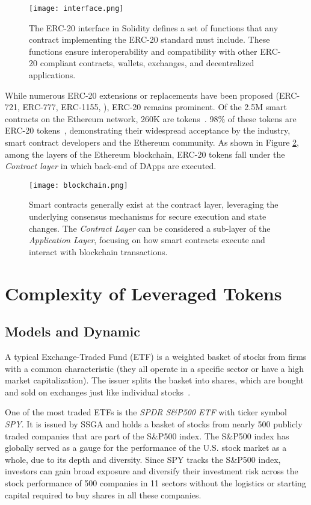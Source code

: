 \begin{figure}[t]
	\centering
	\texttt{[image: interface.png]}
	\caption[The ERC-20 interface in Solidity]{The ERC-20 interface in Solidity defines a set of functions that any contract implementing the ERC-20 standard must include. These functions ensure interoperability and compatibility with other ERC-20 compliant contracts, wallets, exchanges, and decentralized applications.}
	\label{fig:interface}
\end{figure}

While numerous ERC-20 extensions or replacements have been proposed (\eg ERC-721, ERC-777, ERC-1155, \etc), ERC-20 remains prominent. Of the 2.5M smart contracts on the Ethereum network, 260K are tokens~\cite{TokenTracker}. 98\% of these tokens are ERC-20 tokens~\cite{TokenTracker}, demonstrating their widespread acceptance by the industry, smart contract developers and the Ethereum community. As shown in Figure \ref{fig:layers}, among the layers of the Ethereum blockchain, ERC-20 tokens fall under the \textit{Contract layer} in which back-end of DApps are executed.

\begin{figure}[t]
	\centering
	\texttt{[image: blockchain.png]}
	\caption[Ethereum layers and Smart Contract execution]{Smart contracts generally exist at the contract layer, leveraging the underlying consensus mechanisms for secure execution and state changes. The \textit{Contract Layer} can be considered a sub-layer of the \textit{Application Layer}, focusing on how smart contracts execute and interact with blockchain transactions.}
	\label{fig:layers}
\end{figure}

\section{Complexity of Leveraged Tokens}
\subsection{Models and Dynamic}
A typical Exchange-Traded Fund (ETF) is a weighted basket of stocks from firms with a common characteristic (\eg they all operate in a specific sector or have a high market capitalization). The issuer splits the basket into shares, which are bought and sold on exchanges just like individual stocks~\cite{liebi2020effect}.
\begin{example}
	One of the most traded ETFs is the \textsl{SPDR S\&P500 ETF} with ticker symbol \textsl{SPY}. It is issued by SSGA and holds a basket of stocks from nearly 500 publicly traded companies that are part of the S\&P500 index. The S\&P500 index has globally served as a gauge for the performance of the U.S. stock market as a whole, due to its depth and diversity. Since SPY tracks the S\&P500 index, investors can gain broad exposure and diversify their investment risk across the stock performance of 500 companies in 11 sectors without the logistics or starting capital required to buy shares in all these companies.
\end{example}

